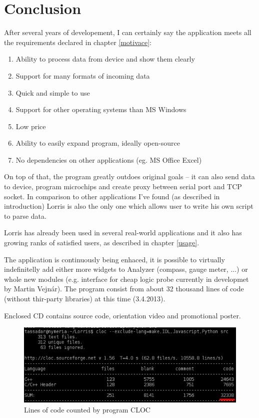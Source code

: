 \documentclass[12pt, a4paper, oneside]{article}
\newcommand{\Has}{\textcolor{green}{\CheckmarkBold}}
\begin{document}
\section*{Conclusion}
After several years of developement, I can certainly say the application meets all the requirements declared in chapter \ref{motivace}:
\begin{enumerate}[label=\Has\hspace{1.5mm}\arabic{*}.]
    \item Ability to process data from device and show them clearly %
    \item Support for many formats of incoming data%
    \item Quick and simple to use%
    \item Support for other operating systems than MS Windows %
    \item Low price%
    \item Ability to easily expand program, ideally open-source %
    \item No dependencies on other applications (eg. MS Office Excel) %
\end{enumerate}
On top of that, the program greatly outdoes original goals -- it can also send data to device, program microchips and create proxy between serial port and TCP socket. In comparison to other applications I've found (as described in introduction) Lorris is also the only one which allows user to write his own script to parse data.

Lorris has already been used in several real-world applications and it also has growing ranks of satisfied users, as described in chapter \ref{usage}.

The application is continuously being enhaced, it is possible to virtually indefinitelly add either more widgets to Analyzer (compass, gauge meter, ...) or whole new modules (e.g. interface for cheap logic probe currently in developmet by Martin Vejnár). The program consist from about 32 thousand lines of code (without thir-party libraries) at this time (3.4.2013).

Enclosed CD contains source code, orientation video and promotional poster.
\begin{figure}[H]
\begin{center}
\includegraphics[width=\textwidth]{img/cloc_edit.png}
\caption{Lines of code counted by program CLOC\cite{cloc}}
\end{center}
\end{figure}
\end{document}

